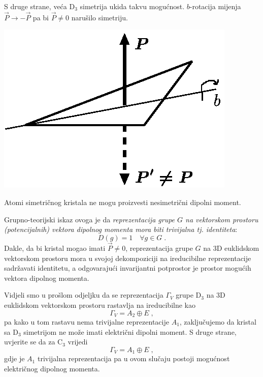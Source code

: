 S druge strane, veća D$_3$ simetrija ukida takvu mogućnost. $b$-rotacija
mijenja $\vec{P}\to-\vec{P}$ pa bi $\vec{P}\neq 0$ narušilo simetriju.

\centerline{\includegraphics[scale=1.0]{pics/nodipol.eps}}

Atomi simetričnog kristala ne mogu proizvesti nesimetrični dipolni moment.

Grupno-teorijski iskaz ovoga je da \emph{reprezentacija grupe $G$ na vektorskom
prostoru (potencijalnih) vektora dipolnog momenta mora biti trivijalna tj.
identiteta}:
\begin{displaymath}
   D(g)=1 \quad \forall g\in G \;.
\end{displaymath}
Dakle, da bi kristal mogao imati $\vec{P}\neq 0$, reprezentacija grupe $G$ na 
3D euklidskom vektorskom prostoru mora 
u svojoj dekompoziciji na ireducibilne reprezentacije sadržavati identitetu,
a odgovarajući invarijantni potprostor je prostor mogućih vektora dipolnog momenta.

Vidjeli smo u prošlom odjeljku da se reprezentacija $\Gamma_V$ grupe D$_3$ na 3D
euklidskom vektorskom prostoru rastavlja na ireducibilne kao
\begin{displaymath}
             \Gamma_V = A_2 \oplus E \;,
\end{displaymath}
pa kako u tom rastavu nema trivijalne reprezentacije $A_1$, zaključujemo
da kristal sa D$_3$ simetrijom ne može imati električni dipolni moment.
S druge strane, uvjerite se da za C$_3$ vrijedi
\begin{displaymath}
             \Gamma_V = A_1 \oplus E \;,
\end{displaymath}
gdje je $A_1$ trivijalna reprezentacija
pa u ovom slučaju postoji mogućnost električnog dipolnog momenta.


